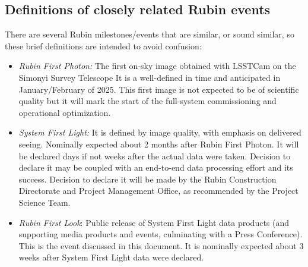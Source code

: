 \subsection{Definitions of closely related Rubin events}

There are several Rubin milestones/events that are similar, or sound similar, so these brief definitions
are intended to avoid confusion:
\begin{itemize}
\item {\it Rubin First Photon:} The first on-sky image obtained with LSSTCam on the Simonyi Survey Telescope
  It is a well-defined in time and anticipated in January/February of 2025. This first image is not expected to be
  of scientific quality but it will mark the start of the full-system commissioning and operational optimization.
\item {\it System First Light:} It is defined by image quality, with emphasis on delivered seeing.
Nominally expected about 2 months after Rubin First Photon. It will be declared days if not weeks after
the actual data were taken. Decision to declare it may be coupled with an end-to-end data processing effort
and its success. Decision to declare it will be made by the Rubin Construction Directorate and Project Management
Office, as recommended by the Project Science Team.  
\item {\it Rubin First Look}:  Public release of System First Light data products (and supporting media products
  and events, culminating with a  Press Conference). This is the event discussed in this document.
  It is nominally expected about 3 weeks after System First Light data were declared.
\end{itemize}
  



